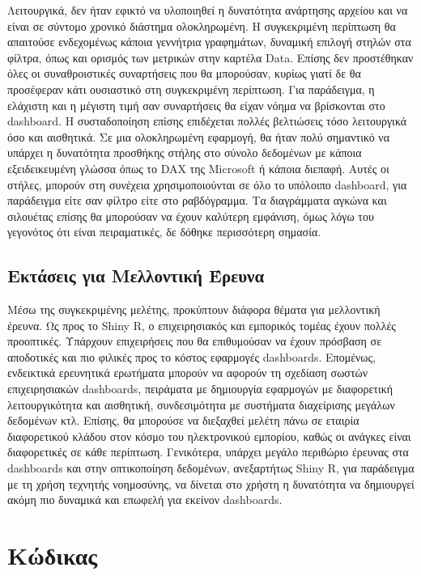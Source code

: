 \documentclass[greek, 12pt]{article}
\begin{document}
Λειτουργικά, δεν ήταν εφικτό να υλοποιηθεί η δυνατότητα ανάρτησης αρχείου και να είναι σε σύντομο χρονικό διάστημα ολοκληρωμένη. Η συγκεκριμένη περίπτωση θα απαιτούσε ενδεχομένως κάποια γεννήτρια γραφημάτων, δυναμική επιλογή στηλών στα φίλτρα, όπως και ορισμός των μετρικών στην καρτέλα Data. Επίσης δεν προστέθηκαν όλες οι συναθροιστικές συναρτήσεις που θα μπορούσαν, κυρίως γιατί δε θα προσέφεραν κάτι ουσιαστικό στη συγκεκριμένη περίπτωση. Για παράδειγμα, η ελάχιστη και η μέγιστη τιμή σαν συναρτήσεις θα είχαν νόημα να βρίσκονται στο dashboard. Η συσταδοποίηση επίσης επιδέχεται πολλές βελτιώσεις τόσο λειτουργικά όσο και αισθητικά. Σε μια ολοκληρωμένη εφαρμογή, θα ήταν πολύ σημαντικό να υπάρχει η δυνατότητα προσθήκης στήλης στο σύνολο δεδομένων με κάποια εξειδεικευμένη γλώσσα όπως το DAX της Microsoft ή κάποια διεπαφή. Αυτές οι στήλες, μπορούν στη συνέχεια χρησιμοποιούνται σε όλο το υπόλοιπο dashboard, για παράδειγμα είτε σαν φίλτρο είτε στο ραβδόγραμμα. Τα διαγράμματα αγκώνα και σιλουέτας επίσης θα μπορούσαν να έχουν καλύτερη εμφάνιση, όμως λόγω του γεγονότος ότι είναι πειραματικές, δε δόθηκε περισσότερη σημασία.

\subsection{Εκτάσεις για Μελλοντική Έρευνα}

Μέσω της συγκεκριμένης μελέτης, προκύπτουν διάφορα θέματα για μελλοντική έρευνα. Ως προς το Shiny R, ο επιχειρησιακός και εμπορικός τομέας έχουν πολλές προοπτικές. Υπάρχουν επιχειρήσεις που θα επιθυμούσαν να έχουν πρόσβαση σε αποδοτικές και πιο φιλικές προς το κόστος εφαρμογές dashboards. Επομένως, ενδεικτικά ερευνητικά ερωτήματα μπορούν να αφορούν τη σχεδίαση σωστών επιχειρησιακών dashboards, πειράματα με δημιουργία εφαρμογών με διαφορετική λειτουργικότητα και αισθητική, συνδεσιμότητα με συστήματα διαχείρισης μεγάλων δεδομένων κτλ. Επίσης, θα μπορούσε να διεξαχθεί μελέτη πάνω σε εταιρία διαφορετικού κλάδου στον κόσμο του ηλεκτρονικού εμπορίου, καθώς οι ανάγκες είναι διαφορετικές σε κάθε περίπτωση. Γενικότερα, υπάρχει μεγάλο περιθώριο έρευνας στα dashboards και στην οπτικοποίηση δεδομένων, ανεξαρτήτως Shiny R, για παράδειγμα με τη χρήση τεχνητής νοημοσύνης, να δίνεται στο χρήστη η δυνατότητα να δημιουργεί ακόμη πιο δυναμικά και επωφελή για εκείνον dashboards.

\newpage




\newpage

\appendix
\section{Κώδικας}

\end{document}

